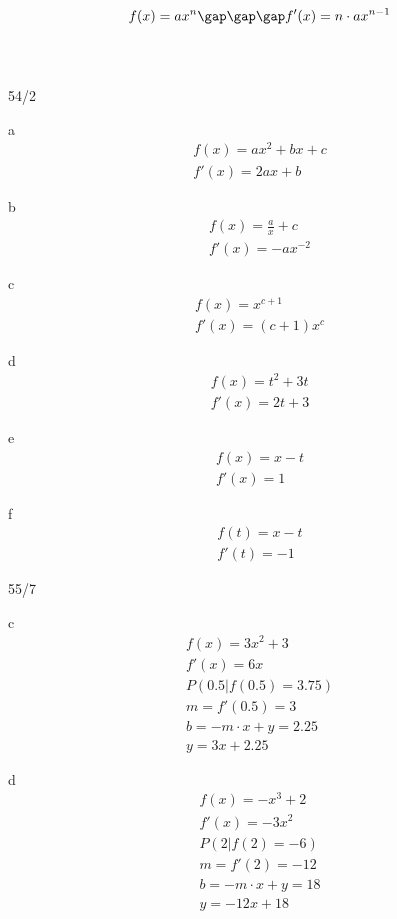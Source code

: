 $$f(x) = ax^n \gap\gap\gap f'(x) = n \cdot ax^{n-1}$$ \\\\
\begin{exercise}{54/2}
  \item [a]
  \begin{gather*}
    f(x) = ax^2 + bx + c \\
    f'(x) = 2ax + b
  \end{gather*}
  \item [b]
  \begin{gather*}
    f(x) = \frac{a}{x} + c \\
    f'(x) = -ax^{-2}
  \end{gather*}
  \item [c]
  \begin{gather*}
    f(x) = x^{c + 1} \\
    f'(x) = (c + 1)x^c
  \end{gather*}
  \item [d]
  \begin{gather*}
    f(x) = t^2 + 3t \\
    f'(x) = 2t + 3
  \end{gather*}
  \item [e]
  \begin{gather*}
    f(x) = x - t \\
    f'(x) = 1
  \end{gather*}
  \item [f]
  \begin{gather*}
    f(t) = x - t \\
    f'(t) = -1
  \end{gather*}
\end{exercise}
\begin{exercise}{55/7}
  \item [c]
  \begin{gather*}
    f(x) = 3x^2 + 3 \\
    f'(x) = 6x \\
    P(0.5 | f(0.5) = 3.75) \\
    m = f'(0.5) = 3 \\
    b = -m \cdot x + y = 2.25 \\
    y = 3x + 2.25
  \end{gather*}
  \item [d]
  \begin{gather*}
    f(x) = -x^3 + 2 \\
    f'(x) = -3x^2 \\
    P(2 | f(2) = -6) \\
    m = f'(2) = -12 \\
    b = -m \cdot x + y = 18 \\
    y = -12x + 18
  \end{gather*}
\end{exercise}
